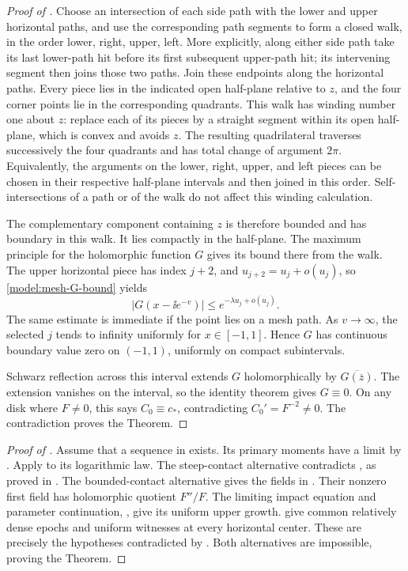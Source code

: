 \begin{proof}[Proof of ]
Choose an intersection of each side path with the lower and upper
horizontal paths, and use the corresponding path segments to form a
closed walk, in the order lower, right, upper, left.  More explicitly,
along either side path take its last lower-path hit before its first
subsequent upper-path hit; its intervening segment then joins those
two paths.  Join these endpoints along the horizontal paths.  Every
piece lies in the indicated open half-plane relative to \(z\), and
the four corner points lie in the corresponding quadrants.  This
walk has winding number one about \(z\): replace each of its pieces
by a straight segment within its open half-plane, which is convex
and avoids \(z\).  The resulting quadrilateral traverses successively
the four quadrants and has total change of argument \(2\pi\).
Equivalently, the arguments on the lower, right, upper, and left
pieces can be chosen in their respective half-plane intervals and
then joined in this order.  Self-intersections of a path or of the
walk do not affect this winding calculation.

The complementary component containing \(z\) is therefore bounded
and has boundary in this walk.  It lies compactly in the half-plane.
The maximum principle for the holomorphic function \(G\) gives its
bound there from the walk.  The upper horizontal piece has index
\(j+2\), and \(u_{j+2}=u_j+o(u_j)\), so
\eqref{model:mesh-G-bound} yields
\[
 |G(x-\ii e^{-v})|\le e^{-\lambda u_j+o(u_j)}.
\]
The same estimate is immediate if the point lies on a mesh path.
As \(v\to\infty\), the selected \(j\) tends to infinity uniformly
for \(x\in[-1,1]\).  Hence \(G\) has continuous boundary value zero
on \((-1,1)\), uniformly on compact subintervals.

Schwarz reflection across this interval extends \(G\) holomorphically
by \(\overline{G(\overline z)}\).  The extension vanishes on the
interval, so the identity theorem gives \(G\equiv0\).  On any disk
where \(F\ne0\), this says \(C_0\equiv c_*\), contradicting
\(C_0'=F^{-2}\ne0\).  The contradiction proves the Theorem.
\end{proof}

\begin{proof}[Proof of ]
Assume that a sequence in  exists.
Its primary moments have a limit by
.  Apply
 to its logarithmic law.
The steep-contact alternative contradicts
, as proved in
.  The bounded-contact
alternative gives the fields in .
Their nonzero first field has holomorphic quotient \(F''/F\).
The limiting impact equation and parameter continuation,
, give its uniform
upper growth.  
give common relatively dense epochs and uniform witnesses
at every horizontal center.  These are precisely the
hypotheses contradicted by .
Both alternatives are impossible, proving the Theorem.
\end{proof}

